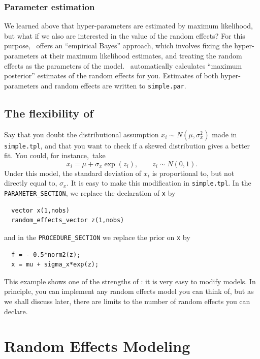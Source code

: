 \documentclass{admbmanual}
\begin{document}
\subsection{Parameter estimation}

We learned above that hyper-parameters are estimated by maximum likelihood, but
what if we also are interested in the value of the random effects? For this
purpose, \scAR\ offers an ``empirical Bayes'' approach, which involves fixing
the hyper-parameters at their maximum likelihood estimates, and treating the
random effects as the parameters of the model. \scAR\ automatically calculates
``maximum posterior'' estimates of the random effects for you. Estimates of both
hyper-parameters and random effects are written to \texttt{simple.par}.

\section{The flexibility of \scAR\label{lognormal}}

Say that you doubt the distributional assumption $x_i\sim N(\mu ,\sigma
_{x}^{2})$ made in \texttt{simple.tpl}, and that you want to check if a skewed
distribution gives a better fit. You could, for instance,~take
\[
x_i=\mu +\sigma_{x}\exp (z_i),\qquad z_i\sim N(0,1).
\]
Under this model, the standard deviation of $x_i$ is proportional to, but not
directly equal to, $\sigma_{x}$. It is easy to make this modification in
\texttt{simple.tpl}. In the \texttt{PARAMETER\_SECTION}, we replace the
declaration of \texttt{x} by
\begin{lstlisting}
  vector x(1,nobs)
  random_effects_vector z(1,nobs)
\end{lstlisting}
and in the \texttt{PROCEDURE\_SECTION} we replace the prior on \texttt{x} by
\begin{lstlisting}
  f = - 0.5*norm2(z);
  x = mu + sigma_x*exp(z);
\end{lstlisting}

This example shows one of the strengths of \scAR: it is very easy to modify
models. In principle, you can implement any random effects model you can think
of, but as we shall discuss later, there are limits to the number of random
effects you can declare.

\chapter{Random Effects Modeling}
\label{ch:random-effects-modeling}
\end{document}
